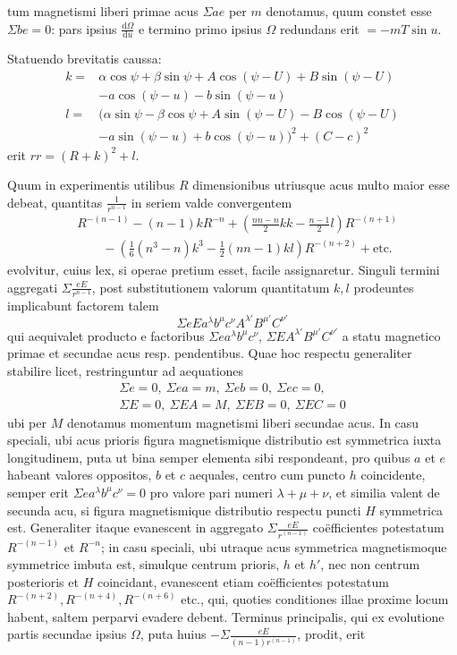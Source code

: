 tum magnetismi liberi primae acus $\Sigma ae$ per $m$ denotamus, quum constet esse $\Sigma be=0$: pars ipsius $\frac{\mathrm{d}\Omega}{\mathrm{d}u}$ e termino primo ipsius $\Omega$ redundans erit $=-mT\sin u$.

Statuendo brevitatis caussa:
\[
\begin{aligned}
k={}&\alpha\cos\psi+\beta\sin\psi+A\cos(\psi-U)+B\sin(\psi-U)\\
&-a\cos(\psi-u)-b\sin(\psi-u)\\
l={}&(\alpha\sin\psi-\beta\cos\psi+A\sin(\psi-U)-B\cos(\psi-U)\\
&-a\sin(\psi-u)+b\cos(\psi-u))^2+(C-c)^2
\end{aligned}
\]
erit $rr=(R+k)^2+l$.

Quum in experimentis utilibus $R$ dimensionibus utriusque acus multo maior esse debeat, quantitas $\frac1{r^{n-1}}$ in seriem valde convergentem
\[
\begin{aligned}
&R^{-(n-1)}-(n-1)kR^{-n}+\left(\frac{nn-n}{2}kk-\frac{n-1}{2}l\right)R^{-(n+1)}\\
&\qquad-\left(\tfrac16(n^3-n)k^3-\tfrac12(nn-1)kl\right)R^{-(n+2)}+\text{etc.}
\end{aligned}
\]
evolvitur, cuius lex, si operae pretium esset, facile assignaretur. Singuli termini aggregati $\Sigma\frac{eE}{r^{n-1}}$, post substitutionem valorum quantitatum $k,l$ prodeuntes implicabunt factorem talem
\[
\Sigma eEa^\lambda b^\mu c^\nu A^{\lambda'}B^{\mu'}C^{\nu'}
\]
qui aequivalet producto e factoribus $\Sigma ea^\lambda b^\mu c^\nu$, $\Sigma EA^{\lambda'}B^{\mu'}C^{\nu'}$ a statu magnetico primae et secundae acus resp. pendentibus. Quae hoc respectu generaliter stabilire licet, restringuntur ad aequationes
\[
\begin{gathered}
\Sigma e=0,\ \Sigma ea=m,\ \Sigma eb=0,\ \Sigma ec=0,\\
\Sigma E=0,\ \Sigma EA=M,\ \Sigma EB=0,\ \Sigma EC=0
\end{gathered}
\]
ubi per $M$ denotamus momentum magnetismi liberi secundae acus. In casu speciali, ubi acus prioris figura magnetismique distributio est symmetrica iuxta longitudinem, puta ut bina semper elementa sibi respondeant, pro quibus $a$ et $e$ habeant valores oppositos, $b$ et $c$ aequales, centro cum puncto $h$ coincidente, semper erit $\Sigma ea^\lambda b^\mu c^\nu=0$ pro valore pari numeri $\lambda+\mu+\nu$, et similia valent de secunda acu, si figura magnetismique distributio respectu puncti $H$ symmetrica est. Generaliter itaque evanescent in aggregato $\Sigma\frac{eE}{r^{(n-1)}}$ coëfficientes potestatum $R^{-(n-1)}$ et $R^{-n}$; in casu speciali, ubi utraque acus symmetrica magnetismoque symmetrice imbuta est, simulque centrum prioris, $h$ et $h'$, nec non centrum posterioris et $H$ coincidant, evanescent etiam coëfficientes potestatum $R^{-(n+2)},R^{-(n+4)},R^{-(n+6)}$ etc., qui, quoties conditiones illae proxime locum habent, saltem perparvi evadere debent. Terminus principalis, qui ex evolutione partis secundae ipsius $\Omega$, puta huius $-\Sigma\frac{eE}{(n-1)r^{(n-1)}}$, prodit, erit
